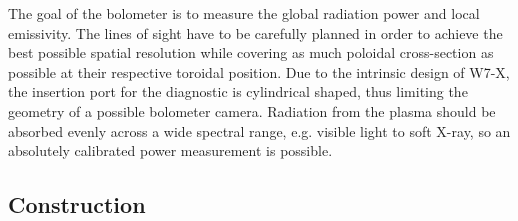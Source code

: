             The goal of the bolometer is to measure the global radiation power and local emissivity. The lines of sight have to be carefully planned in order to achieve the best possible spatial resolution while covering as much poloidal cross-section as possible at their respective toroidal position. Due to the intrinsic design of W7-X, the insertion port for the diagnostic is cylindrical shaped, thus limiting the geometry of a possible bolometer camera. Radiation from the plasma should be absorbed evenly across a wide spectral range, e.g. visible light to soft X-ray, so an absolutely calibrated power measurement is possible.%
%
        \subsection{Construction}\label{subsec:construction}%

